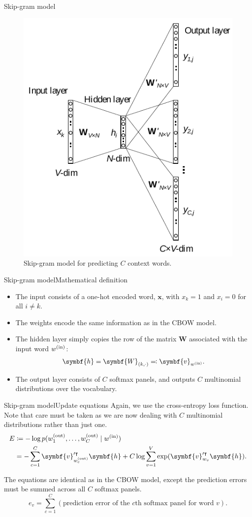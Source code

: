 \documentclass[serif, xcolor={svgnames, table}, usepdftitle=false]{beamer}
\renewcommand*{\vec}{\symbf}
\newcommand*{\mat}{\symbf}
\begin{document}
\begin{frame}{Skip-gram model}
  \begin{figure}
    \centering
    \includegraphics[width=.4\textwidth]{Skip-Gram.pdf}
    \caption{Skip-gram model for predicting \(C\) context words.}
  \end{figure}
\end{frame}

\begin{frame}{Skip-gram model}{Mathematical definition}
  \begin{itemize}
  \item The input consists of a one-hot encoded word, \(\vec{x}\), with
    \(x_k = 1\) and \(x_i = 0\) for all \(i \ne k\).
  \item The weights encode the same information as in the CBOW model.
  \item The hidden layer simply copies the row of the matrix \(\mat{W}\)
    associated with the input word \(w^{\mathrm{(in)}}\):
    \[
      \vec{h} = \mat{W}_{(k, \cdot)} \eqqcolon \vec{v}_{\wi}\text{.}
    \]
  \item The output layer consists of \(C\) softmax panels, and outputs \(C\)
    multinomial distributions over the vocabulary.
  \end{itemize}
\end{frame}

\begin{frame}{Skip-gram model}{Update equations}
  Again, we use the cross-entropy loss function.  Note that care must be taken
  as we are now dealing with \(C\) multinomial distributions rather than just
  one.
  \begin{align*}
    E &\coloneqq -\log p(\wo_1, \ldots, \wo_C \mid \wi) \\
      &= -\sum\limits_{c = 1}^{C} \vec{v}_{\wo_c}^{\prime\intercal} \vec{h} + C \log \sum\limits_{v = 1}^{V}
        \exp(\vec{v}_{w_v}^{\prime\intercal} \vec{h})\text{.}
  \end{align*}

  The equations are identical as in the CBOW model, except the prediction errors
  must be summed across all \(C\) softmax panels.
  \[
    e_v = \sum\limits_{c = 1}^{C}(\text{prediction error of the }c\text{th
      softmax panel for word }v)\text{.}
  \]
\end{frame}
\end{document}
